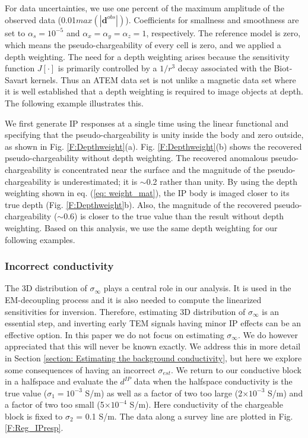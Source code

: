 \documentclass[extra,mreferee]{gji}
\newcommand{\siginf}{\sigma_\infty}
\newcommand{\dip}{d^{IP}}
\begin{document}
For data uncertainties, we use one percent of the maximum amplitude of the observed data (0.01$max(|\mathbf{d}^{obs}|)$). Coefficients for smallness and smoothness are set to $\alpha_s=10^{-5}$ and $\alpha_x=\alpha_y=\alpha_z=1$, respectively. The reference model is zero, which means the pseudo-chargeability of every cell is zero, and we applied a depth weighting.
The need for a depth weighting arises because the sensitivity function $J[\cdot]$ is primarily controlled by a $1/r^3$ decay associated with the Biot-Savart kernels.  Thus an ATEM data set is not unlike a magnetic data set where it is well established that a depth weighting is required to image objects at depth. The following example illustrates this.

We first generate IP responses at a single time using the linear functional and specifying that the pseudo-chargeability is unity inside the body and zero outside, as shown in  Fig. \ref{F:Depthweight}(a).
Fig. \ref{F:Depthweight}(b) shows the recovered pseudo-chargeability without depth weighting.
The recovered anomalous pseudo-chargeability is concentrated  near the surface and the magnitude of the pseudo-chargeability is underestimated; it is $\sim$0.2 rather than unity.
By using the depth weighting shown in eq. (\ref{eq: weight_mat}),  the IP body is imaged closer to its true depth (Fig. \ref{F:Depthweight}b).
Also, the magnitude of the recovered pseudo-chargeability ($\sim$0.6) is closer to the true value than the result without depth weighting.
Based on this analysis, we use the same depth weighting for our  following examples.

\subsubsection{Incorrect conductivity}
\label{subsubsection: Incorrect conductivity}
The 3D distribution of $\siginf$ plays a central role in our analysis. It is used in the EM-decoupling process and it is also needed to compute the linearized sensitivities for inversion.
Therefore, estimating 3D distribution of $\siginf$ is an essential step, and inverting early TEM signals having minor IP effects can be an effective option.
In this paper we do not focus on  estimating $\siginf$. We do however appreciated that this will never be known exactly. We address this in more detail in Section \ref{section: Estimating the background conductivity}, but here we explore some consequences of having an incorrect $\sigma_{est}$. We return to our conductive block in a halfspace and evaluate the $\dip$ data when the halfspace conductivity is the true value ($\sigma_1 = 10^{-3}$ S/m) as well as a factor of two too large (2$\times10^{-3}$ S/m) and a factor of two too small (5$\times10^{-4}$ S/m). Here conductivity of the chargeable block is fixed to $\sigma_2$ = 0.1 S/m. The data along a survey line are plotted in Fig. \ref{F:Reg_IPresp}.
\end{document}
